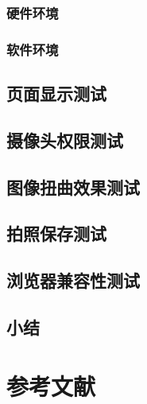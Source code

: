 \documentclass[UTF8,a4paper,zihao=-4,oneside,openany,fontset=none]{ctexrep}
\numberwithin{equation}{chapter}
\begin{document}
\subsection{硬件环境}

\subsection{软件环境}

\section{页面显示测试}

\section{摄像头权限测试}

\section{图像扭曲效果测试}

\section{拍照保存测试}

\section{浏览器兼容性测试}

\section{小结}

\clearpage
\chapter*{参考文献}
\printbibliography[heading=none]
\end{document}

